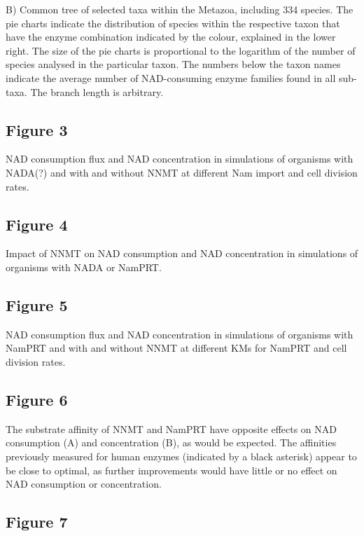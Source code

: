 B) Common tree of selected taxa within the Metazoa, including 334 species. The pie charts indicate the distribution of species within the respective taxon that have the enzyme combination indicated by the colour, explained in the lower right. The size of the pie charts is proportional to the logarithm of the number of species analysed in the particular taxon. The numbers below the taxon names indicate the average number of NAD-consuming enzyme families found in all sub-taxa. The branch length is arbitrary.


\subsection{Figure 3}

NAD consumption flux and NAD concentration in simulations of organisms with NADA(?) and with and without NNMT at different Nam import and cell division rates.


\subsection{Figure 4}

Impact of NNMT on NAD consumption and NAD concentration in simulations of organisms with NADA or NamPRT.


\subsection{Figure 5}

NAD consumption flux and NAD concentration in simulations of organisms with NamPRT and with and without NNMT at different KMs for NamPRT and cell division rates.


\subsection{Figure 6}

The substrate affinity of NNMT and NamPRT have opposite effects on NAD consumption (A) and concentration (B), as would be expected. The affinities previously measured for human enzymes (indicated by a black asterisk) appear to be close to optimal, as further improvements would have little or no effect on NAD consumption or concentration.


\subsection{Figure 7}

